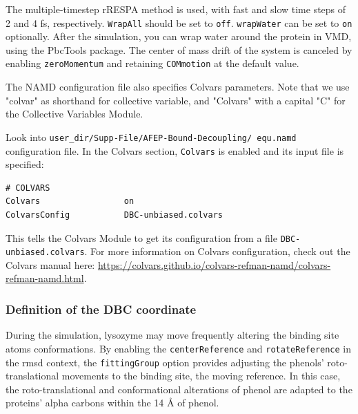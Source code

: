 \documentclass[9pt,tutorial]{livecoms}
\begin{document}
The multiple-timestep rRESPA method is used, with fast and slow time steps of 2 and 4 fs, respectively.
\texttt{WrapAll} should be set to \texttt{off}. \texttt{wrapWater} can be set to \texttt{on} optionally.
After the simulation, you can wrap water around the protein in VMD, using the 
PbcTools package.
The center of mass drift of the system is canceled by enabling \texttt{zeroMomentum} and retaining \texttt{COMmotion} at the default value.

The NAMD configuration file also specifies Colvars parameters.
Note that we use "colvar" as shorthand for collective variable, and "Colvars" with a capital "C" for the Collective Variables Module.

Look into \texttt{user\_dir/Supp-File/AFEP-Bound-Decoupling/ equ.namd} configuration file.
In the Colvars section, \texttt{Colvars} is enabled and its input file is specified:
\begin{verbatim}
# COLVARS
Colvars                 on
ColvarsConfig           DBC-unbiased.colvars
\end{verbatim}

This tells the Colvars Module to get its configuration from a file  \texttt{DBC-unbiased.colvars}.
For more information on Colvars configuration, check out the Colvars manual here: \url{ https://colvars.github.io/colvars-refman-namd/colvars-refman-namd.html}\label{clovar}.

\subsubsection{Definition of the DBC coordinate}\label{Section 6.2.2}


During the simulation, lysozyme may move frequently altering the binding site atoms conformations. By enabling the \texttt{centerReference} and \texttt{rotateReference} in the rmsd context, the \texttt{fittingGroup} option provides adjusting the phenols’ roto-translational movements to the binding site, the moving reference. In this case, the roto-translational and conformational alterations of phenol are adapted to the proteins' alpha carbons within the 14 {\AA} of phenol.
\end{document}
